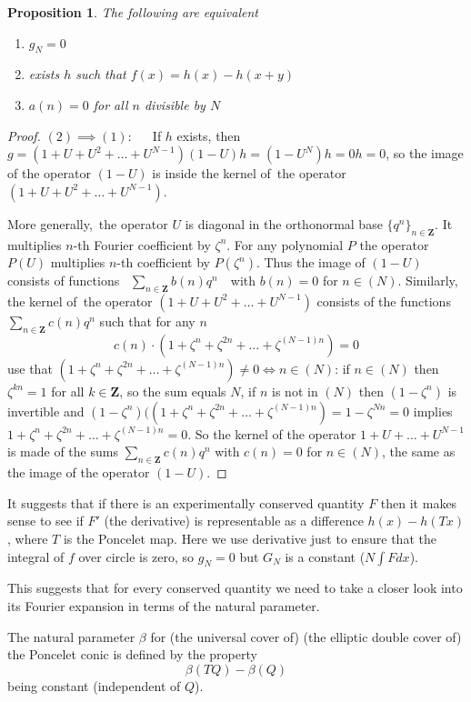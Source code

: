 \documentclass[12pt]{article}
\numberwithin{equation}{section}
\newtheorem{proposition}[dummy]{Proposition} %
\newcommand\Z{\mathbf{Z}}                    %
\begin{document}
\begin{proposition}
The following are equivalent
\begin{enumerate}
\item $g_N = 0$
\item exists $h$ such that $f(x) = h(x) - h(x+y)$
\item $a(n)=0$ for all $n$ divisible by $N$
\end{enumerate}
\end{proposition}
\begin{proof}
$(2)\implies(1)$:   
If $h$ exists, then $g = (1+U+U^2+\dots+U^{N-1}) (1-U) h =  (1-U^N) h = 0 h = 0$,
so the image of the operator $(1-U)$ is inside 
the kernel of the operator $(1+U+U^2+\dots+U^{N-1})$.

More generally, the operator $U$ is diagonal in the orthonormal base $\{q^n\}_{n\in\Z}$.
It multiplies $n$-th Fourier coefficient by $ζ^n$.
For any polynomial $P$ the operator $P(U)$ multiplies $n$-th coefficient by $P(ζ^n)$.
Thus the image of $(1-U)$ consists of functions 
$\sum_{n\in\Z} b(n) q^n$  with $b(n)=0$ for $n\in(N)$.
Similarly, the kernel of the operator $(1+U+U^2+\dots+U^{N-1})$
consists of the functions $\sum_{n\in\Z} c(n) q^n$
such that for any $n$
\[ c(n) \cdot  (1 + ζ^n + ζ^{2n} + \dots + ζ^{(N-1)n}) = 0 \]
use that $(1 + ζ^n + ζ^{2n} + \dots + ζ^{(N-1)n}) \neq 0 \iff  n\in(N)$:
if $n\in(N)$ then $ζ^{kn}=1$ for all $k\in\Z$, so the sum equals $N$,
if $n$ is not in $(N)$ then $(1-ζ^n)$ is invertible
and $(1-ζ^n)((1 + ζ^n + ζ^{2n} + \dots + ζ^{(N-1)n}) = 1-ζ^{Nn} = 0$
implies $1 + ζ^n + ζ^{2n} + \dots + ζ^{(N-1)n} = 0$.
So the kernel of the operator $1+U+\dots+U^{N-1}$ 
is made of the sums $\sum_{n\in\Z} c(n) q^n$ 
with $c(n)=0$ for $n\in(N)$,
the same as the image of the operator $(1-U)$.
\end{proof}

It suggests that if there is an experimentally conserved quantity $F$ 
then it makes sense to see if $F'$ (the derivative) 
is representable as a difference $h(x) - h(Tx)$, 
where $T$ is the Poncelet map.
Here we use derivative just to ensure that the integral of $f$ over circle is zero,
so $g_N=0$ but $G_N$ is a constant ($N \int F dx$).

This suggests that for every conserved quantity we need to take a closer look into its Fourier expansion in terms of the natural parameter.

The natural parameter $β$ for 
(the universal cover of) 
(the elliptic double cover of) 
the Poncelet conic is defined by the property
\[ β(T Q) - β(Q) \]
being constant (independent of $Q$).
\end{document}
